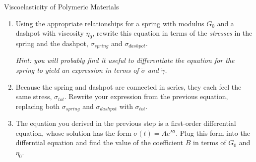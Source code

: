 \begin{activity}{Viscoelasticity of Polymeric Materials}
\begin{exercises}
\begin{enumerate}
				\item Using the appropriate relationships for a spring with modulus $G_0$ and a dashpot with viscosity $\eta_0$, rewrite this equation in terms of the \emph{stresses} in the spring and the dashpot, $\sigma_{spring}$ and $\sigma_{dashpot}$.
				
					\emph{Hint: you will probably find it useful to differentiate the equation for the spring to yield an expression in terms of $\dot\sigma$ and $\dot\gamma$.}
				
					\begin{solution}\end{solution}
					
				\item Because the spring and dashpot are connected in series, they each feel the same stress, $\sigma_{tot}$.  Rewrite your expression from the previous equation, replacing both $\sigma_{spring}$ and $\sigma_{dashpot}$ with $\sigma_{tot}$.
				
					\begin{solution}\end{solution}			
				
				
				\item The equation you derived in the previous step is a first-order differential equation, whose solution has the form $\sigma(t) = A e^{Bt}$.  Plug this form into the differntial equation and find the value of the coefficient $B$ in terms of $G_0$ and $\eta_0$.
				
					\begin{solution}\end{solution} 
					

\end{enumerate}
\end{exercises}
\end{activity}

